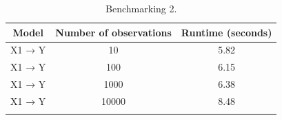 \documentclass[
  11pt,
  article]{jss}
\begin{document}
\begin{longtable}{ccc}

\toprule
Model & Number of observations & Runtime (seconds)\\
\midrule
X1 → Y & 10 & 5.82\\
X1 → Y & 100 & 6.15\\
X1 → Y & 1000 & 6.38\\
X1 → Y & 10000 & 8.48\\
\bottomrule


\caption{\label{tbl-bench2}Benchmarking 2.}

\tabularnewline
\end{longtable}

\newpage{}
\end{document}
